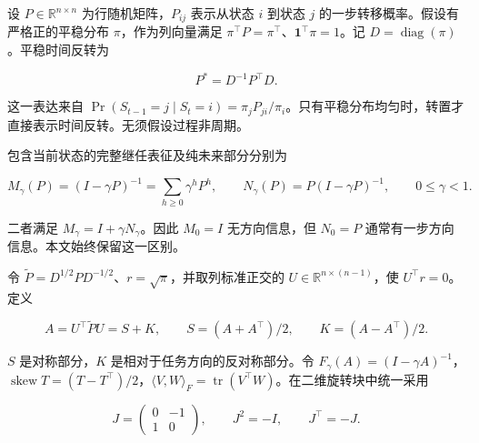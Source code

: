\documentclass[11pt,a4paper]{article}
\begin{document}
\par
\noindent\begin{minipage}{\linewidth}

设 \(P\in\mathbb R^{n\times n}\) 为行随机矩阵，\(P_{ij}\) 表示从状态
\(i\) 到状态 \(j\) 的一步转移概率。假设有严格正的平稳分布
\(\pi\)，作为列向量满足
\(\pi^\top P=\pi^\top\)、\(\mathbf1^\top\pi=1\)。记
\(D=\operatorname{diag}(\pi)\)。平稳时间反转为

\[
P^*=D^{-1}P^\top D.
\]

\end{minipage}\par

这一表达来自
\(\Pr(S_{t-1}=j\mid S_t=i)=\pi_jP_{ji}/\pi_i\)。只有平稳分布均匀时，转置才直接表示时间反转。无须假设过程非周期。

\par
\noindent\begin{minipage}{\linewidth}

包含当前状态的完整继任表征及纯未来部分分别为

\[
M_\gamma(P)=(I-\gamma P)^{-1}
=\sum_{h\ge0}\gamma^hP^h,
\qquad
N_\gamma(P)=P(I-\gamma P)^{-1},
\qquad 0\le\gamma<1.
\]

\end{minipage}\par

二者满足 \(M_\gamma=I+\gamma N_\gamma\)。因此 \(M_0=I\) 无方向信息，但
\(N_0=P\) 通常有一步方向信息。本文始终保留这一区别。

\par
\noindent\begin{minipage}{\linewidth}

令 \(\widetilde P=D^{1/2}PD^{-1/2}\)、\(r=\sqrt\pi\)，并取列标准正交的
\(U\in\mathbb R^{n\times(n-1)}\)，使 \(U^\top r=0\)。定义

\[
A=U^\top\widetilde P U=S+K,
\qquad S=(A+A^\top)/2,
\qquad K=(A-A^\top)/2.
\]

\end{minipage}\par

\(S\) 是对称部分，\(K\) 是相对于任务方向的反对称部分。令
\(F_\gamma(A)=(I-\gamma A)^{-1}\)，\(\operatorname{skew}T=(T-T^\top)/2\)，\(\langle V,W\rangle_F=\operatorname{tr}(V^\top W)\)。在二维旋转块中统一采用

\[
J=\begin{pmatrix}0&-1\\1&0\end{pmatrix},
\qquad J^2=-I,
\qquad J^\top=-J.
\]
\end{document}
